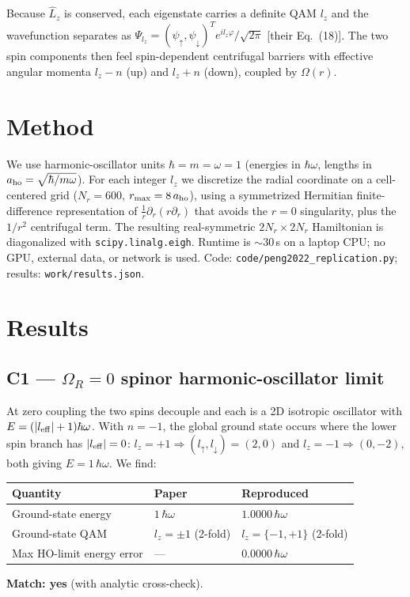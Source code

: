\documentclass[11pt]{article}
\begin{document}
Because $\hat L_z$ is conserved, each eigenstate carries a definite QAM $l_z$ and
the wavefunction separates as $\Psi_{l_z}=(\psi_\uparrow,\psi_\downarrow)^Te^{il_z\varphi}/\sqrt{2\pi}$
[their Eq.~(18)]. The two spin components then feel spin-dependent centrifugal
barriers with effective angular momenta $l_z-n$ (up) and $l_z+n$ (down), coupled
by $\Omega(r)$.

\section{Method}
We use harmonic-oscillator units $\hbar=m=\omega=1$ (energies in $\hbar\omega$,
lengths in $a_{\rm ho}=\sqrt{\hbar/m\omega}$). For each integer $l_z$ we discretize
the radial coordinate on a cell-centered grid ($N_r=600$, $r_{\max}=8\,a_{\rm ho}$),
using a symmetrized Hermitian finite-difference representation of
$\tfrac1r\partial_r(r\partial_r)$ that avoids the $r=0$ singularity, plus the
$1/r^2$ centrifugal term. The resulting real-symmetric $2N_r\times2N_r$
Hamiltonian is diagonalized with \texttt{scipy.linalg.eigh}. Runtime is $\sim$30\,s
on a laptop CPU; no GPU, external data, or network is used. Code:
\texttt{code/peng2022\_replication.py}; results: \texttt{work/results.json}.

\section{Results}

\subsection*{C1 --- $\Omega_R=0$ spinor harmonic-oscillator limit}
At zero coupling the two spins decouple and each is a 2D isotropic oscillator with
$E=(|l_{\rm eff}|+1)\hbar\omega$. With $n=-1$, the global ground state occurs where the
lower spin branch has $|l_{\rm eff}|=0$: $l_z=+1\Rightarrow(l_\uparrow,l_\downarrow)=(2,0)$ and
$l_z=-1\Rightarrow(0,-2)$, both giving $E=1\,\hbar\omega$. We find:
\begin{center}
\begin{tabular}{lll}
\toprule
Quantity & Paper & Reproduced \\
\midrule
Ground-state energy & $1\,\hbar\omega$ & $1.0000\,\hbar\omega$ \\
Ground-state QAM & $l_z=\pm1$ (2-fold) & $l_z=\{-1,+1\}$ (2-fold) \\
Max HO-limit energy error & --- & $0.0000\,\hbar\omega$ \\
\bottomrule
\end{tabular}
\end{center}
\textbf{Match: yes} (with analytic cross-check).
\end{document}
